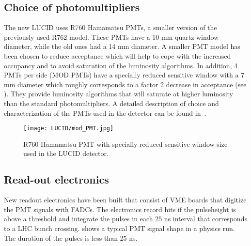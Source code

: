 \subsection{Choice of photomultipliers}
\label{subsec:PMTChoice}


The new LUCID uses R760 Hamamatsu PMTs, a smaller version of the previously used R762 model. These PMTs have a 
10 mm quartz window diameter, while the old ones had a 14 mm diameter. A smaller PMT model has been chosen to reduce acceptance 
which will help to cope with the increased occupancy and to avoid saturation of the luminosity algorithms.
In addition, 4 PMTs per side (MOD PMTs) have a specially reduced sensitive window with a 7 mm diameter which roughly 
corresponds to a factor 2 decrease in acceptance (see ). They provide luminosity algorithms that will saturate at 
higher luminosity than the standard photomultipliers. A detailed description of choice and characterization of the PMTs used in the detector can be found in~\cite{Alberghi:2016tad}.


\begin{figure}
\centering
\texttt{[image: LUCID/mod\_PMT.jpg]}
\caption{R760 Hamamatsu PMT with specially reduced sensitive window size used in the LUCID detector.}
\label{fig:modPMT}
\end{figure}

\subsection{Read-out electronics}
\label{subsec:LUCIDElectronics}

New readout electronics have been built that consist of VME boards that digitize the PMT signals with FADCs. 
The electronics record hits if the pulseheight is above a threshold and integrate the pulses in each 25 ns 
interval that corresponds to a LHC bunch crossing.  shows a typical PMT signal shape in 
a physics run. The duration of the pulses is less than 25 ns.

